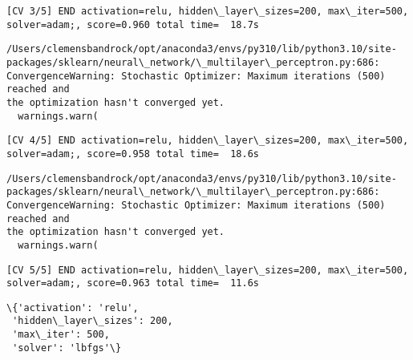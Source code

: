 \documentclass[11pt]{article}
\makeatletter
\newcommand{\boxspacing}{\kern\kvtcb@left@rule\kern\kvtcb@boxsep}
\newcommand{\prompt}[4]{
        {\ttfamily\llap{{\color{#2}[#3]:\hspace{3pt}#4}}\vspace{-\baselineskip}}
    }
\makeatother
\begin{document}
    \begin{Verbatim}[commandchars=\\\{\}]
[CV 3/5] END activation=relu, hidden\_layer\_sizes=200, max\_iter=500,
solver=adam;, score=0.960 total time=  18.7s
    \end{Verbatim}

    \begin{Verbatim}[commandchars=\\\{\}]
/Users/clemensbandrock/opt/anaconda3/envs/py310/lib/python3.10/site-
packages/sklearn/neural\_network/\_multilayer\_perceptron.py:686:
ConvergenceWarning: Stochastic Optimizer: Maximum iterations (500) reached and
the optimization hasn't converged yet.
  warnings.warn(
    \end{Verbatim}

    \begin{Verbatim}[commandchars=\\\{\}]
[CV 4/5] END activation=relu, hidden\_layer\_sizes=200, max\_iter=500,
solver=adam;, score=0.958 total time=  18.6s
    \end{Verbatim}

    \begin{Verbatim}[commandchars=\\\{\}]
/Users/clemensbandrock/opt/anaconda3/envs/py310/lib/python3.10/site-
packages/sklearn/neural\_network/\_multilayer\_perceptron.py:686:
ConvergenceWarning: Stochastic Optimizer: Maximum iterations (500) reached and
the optimization hasn't converged yet.
  warnings.warn(
    \end{Verbatim}

    \begin{Verbatim}[commandchars=\\\{\}]
[CV 5/5] END activation=relu, hidden\_layer\_sizes=200, max\_iter=500,
solver=adam;, score=0.963 total time=  11.6s
    \end{Verbatim}

            \begin{tcolorbox}[breakable, size=fbox, boxrule=.5pt, pad at break*=1mm, opacityfill=0]
\prompt{Out}{outcolor}{160}{\boxspacing}
\begin{Verbatim}[commandchars=\\\{\}]
\{'activation': 'relu',
 'hidden\_layer\_sizes': 200,
 'max\_iter': 500,
 'solver': 'lbfgs'\}
\end{Verbatim}
\end{tcolorbox}
        
\end{document}
